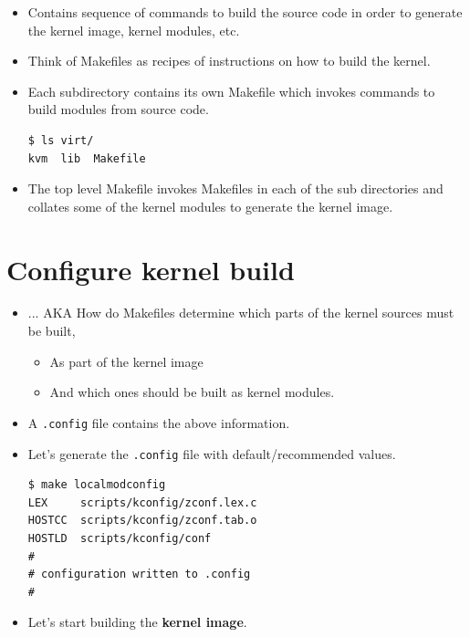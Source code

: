 \documentclass{beamer}
\begin{document}
\begin{frame}[fragile]
  \begin{itemize}
  \item Contains sequence of commands to build the source code in
    order to generate the kernel image, kernel modules, etc.
  \item Think of Makefiles as recipes of instructions on how to build the
    kernel.
  \item Each subdirectory contains its own Makefile which invokes commands to
    build modules from source code.
\begin{lstlisting}
$ ls virt/
kvm  lib  Makefile
\end{lstlisting}
  \item The top level Makefile invokes Makefiles in each of the sub directories
    and collates some of the kernel modules to generate the kernel image.
  \end{itemize}
\end{frame}

\section{Configure kernel build}
\label{sec:configure-kbuild}

\begin{frame}[fragile]
  \begin{itemize}
  \item ... AKA How do Makefiles determine which parts of the kernel sources must be built,
    \begin{itemize}
    \item As part of the kernel image
    \item And which ones should be built as kernel modules.
    \end{itemize}
  \item A \texttt{.config} file contains the above information.
  \item Let's generate the \texttt{.config} file with default/recommended
    values.
    \begin{lstlisting}
$ make localmodconfig
LEX     scripts/kconfig/zconf.lex.c
HOSTCC  scripts/kconfig/zconf.tab.o
HOSTLD  scripts/kconfig/conf
#
# configuration written to .config
#
\end{lstlisting}
  \item Let's start building the \textbf{kernel image}.
\end{itemize}
\end{frame}
\end{document}
